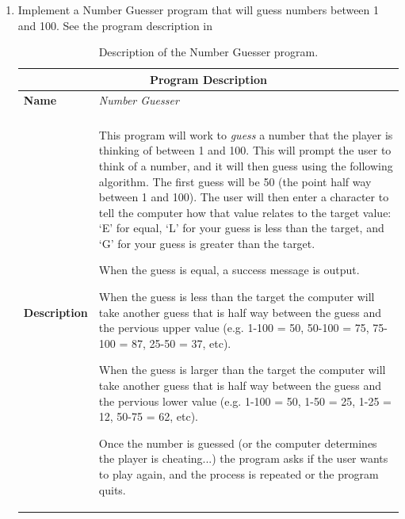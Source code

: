 \begin{enumerate}
  \item Implement a Number Guesser program that will guess numbers between 1 and 100. See the program description in 

  \begin{table}[htbp]
  \centering
  \begin{tabular}{l|p{10cm}}
    \hline
    \multicolumn{2}{c}{\textbf{Program Description}} \\
    \hline
    \textbf{Name} & \emph{Number Guesser} \\
    \\
    \textbf{Description} & This program will work to \emph{guess} a number that the player is thinking of between 1 and 100. This will prompt the user to think of a number, and it will then guess using the following algorithm. The first guess will be 50 (the point half way between 1 and 100). The user will then enter a character to tell the computer how that value relates to the target value: `E' for equal, `L' for your guess is less than the target, and `G' for your guess is greater than the target. \newline

    When the guess is equal, a success message is output. \newline

    When the guess is less than the target the computer will take another guess that is half way between the guess and the pervious upper value (e.g. 1-100 = 50, 50-100 = 75, 75-100 = 87, 25-50 = 37, etc). \newline

    When the guess is larger than the target the computer will take another guess that is half way between the guess and the pervious lower value (e.g. 1-100 = 50, 1-50 = 25, 1-25 = 12, 50-75 = 62, etc). \newline

    Once the number is guessed (or the computer determines the player is cheating...) the program asks if the user wants to play again, and the process is repeated or the program quits.\\
    \hline
  \end{tabular}
  \caption{Description of the Number Guesser program.}
  \label{tbl:number_guesser}
  \end{table}


\end{enumerate}
